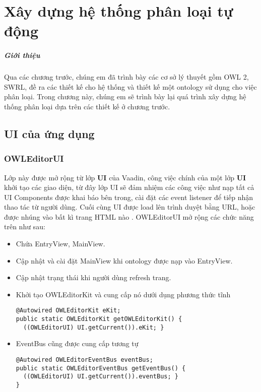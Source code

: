 \chapter{Xây dựng hệ thống phân loại tự động}
\paragraph{Giới thiệu} Qua các chương trước, chúng em đã trình bày các cơ sở lý thuyết gồm OWL 2, SWRL, đề ra các thiết kế cho hệ thống và thiết kế một ontology sử dụng cho việc phân loại. Trong chương này, chúng em sẽ trình bày lại quá trình xây dựng hệ thống phân loại dựa trên các thiết kế ở chương trước.
\section{UI của ứng dụng}
\subsection{OWLEditorUI}
Lớp này được mở rộng từ lớp \textbf{UI} của Vaadin, công việc chính của một lớp \textbf{UI} khởi tạo các  giao diện, từ đây lớp UI sẽ đảm nhiệm các công việc như nạp tất cả UI Components được khai báo bên trong, cài đặt các event listener để tiếp nhận thao tác từ người dùng. Cuối cùng UI được load lên trình duyệt bằng URL, hoặc được nhúng vào bất kì trang HTML nào \cite{vaadinarchitecture}. OWLEditorUI mở rộng các chức năng trên như sau:
\begin{itemize}
\item Chứa EntryView, MainView.
\item Cập nhật và cài đặt MainView khi ontology được nạp vào EntryView.
\item Cập nhật trạng thái khi người dùng refresh trang.
\item Khởi tạo OWLEditorKit và cung cấp nó dưới dụng phương thức tĩnh
\begin{verbatim}
@Autowired OWLEditorKit eKit;
public static OWLEditorKit getOWLEditorKit() {
  ((OWLEditorUI) UI.getCurrent()).eKit; }
\end{verbatim}
\item EventBus cũng được cung cấp tương tự 
\begin{verbatim}
@Autowired OWLEditorEventBus eventBus;
public static OWLEditorEventBus getEventBus() {
  ((OWLEditorUI) UI.getCurrent()).eventBus; }	
}
\end{verbatim}
\end{itemize}
